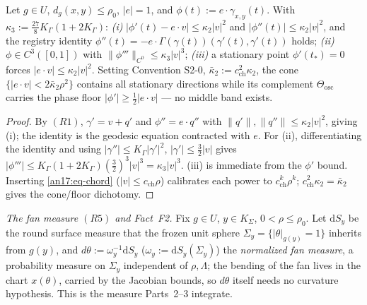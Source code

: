 \begin{proposition}
\label{an17:prop-R3}%
\label{an17:R3}%
Let $g\in U$, $d_g(x,y)\le\rho_0$, $|e|=1$, and $\phi(t):=e\cdot\gamma_{x,y}(t)$.
With $\kappa_3:=\tfrac{27}8K_\Gamma(1+2K_\Gamma)$:
\emph{(i)} $|\phi'(t)-e\cdot v|\le\kappa_2|v|^2$ and $|\phi''(t)|\le\kappa_2|v|^2$,
and the registry identity $\phi''(t)=-e\cdot\Gamma(\gamma(t))(\gamma'(t),\gamma'
(t))$ holds; \emph{(ii)} $\phi\in C^3([0,1])$ with $\|\phi'''\|_{C^0}\le\kappa_3
|v|^3$; \emph{(iii)} a stationary point $\phi'(t_*)=0$ forces $|e\cdot v|\le
\kappa_2|v|^2$. Setting Convention S2-0, $\bar\kappa_2:=c_{\mathrm{ch}}^2\kappa_2$,
the cone $\{|e\cdot v|<2\bar\kappa_2\rho^2\}$ contains all stationary directions
while its complement $\Theta_{\mathrm{osc}}$ carries the phase floor
$|\phi'|\ge\tfrac12|e\cdot v|$ --- no middle band exists.
\end{proposition}
\begin{proof}
By $(R1)$, $\gamma'=v+q'$ and $\phi''=e\cdot q''$ with $\|q'\|,\|q''\|\le
\kappa_2|v|^2$, giving (i); the identity is the geodesic equation contracted with
$e$. For (ii), differentiating the identity and using $|\gamma''|\le K_\Gamma
|\gamma'|^2$, $|\gamma'|\le\tfrac32|v|$ gives $|\phi'''|\le K_\Gamma(1+2K_\Gamma)
(\tfrac32)^3|v|^3=\kappa_3|v|^3$. (iii) is immediate from the $\phi'$ bound.
Inserting \eqref{an17:eq-chord} ($|v|\le c_{\mathrm{ch}}\rho$) calibrates each
power to $c_{\mathrm{ch}}^k\rho^k$; $c_{\mathrm{ch}}^2\kappa_2=\bar\kappa_2$ gives
the cone/floor dichotomy.
\end{proof}

\emph{The fan measure $(R5)$ and Fact~F2.} Fix $g\in U$, $y\in K_\Sigma$,
$0<\rho\le\rho_0$. Let $\mathrm dS_y$ be the round surface measure that the
frozen unit sphere $\Sigma_y=\{|\theta|_{g(y)}=1\}$ inherits from $g(y)$, and
$d\theta:=\omega_y^{-1}\mathrm dS_y$ ($\omega_y:=\mathrm dS_y(\Sigma_y)$) the
\emph{normalized fan measure}, a probability measure on $\Sigma_y$ independent of
$\rho,\Lambda$; the bending of the fan lives in the chart $x(\theta)$, carried by
the Jacobian bounds, so $d\theta$ itself needs no curvature hypothesis. This is
the measure Parts~2--3 integrate.

